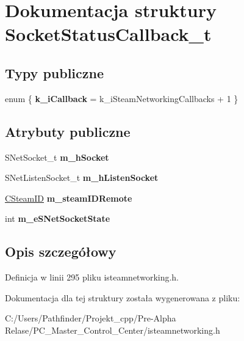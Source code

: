 \hypertarget{struct_socket_status_callback__t}{}\section{Dokumentacja struktury Socket\+Status\+Callback\+\_\+t}
\label{struct_socket_status_callback__t}
\subsection*{Typy publiczne}
\begin{DoxyCompactItemize}
\item 
\mbox{\label{struct_socket_status_callback__t_a965fa48a222eeb9caa24f61f2b29d069}} 
enum \{ {\bfseries k\+\_\+i\+Callback} = k\+\_\+i\+Steam\+Networking\+Callbacks + 1
 \}
\end{DoxyCompactItemize}
\subsection*{Atrybuty publiczne}
\begin{DoxyCompactItemize}
\item 
\mbox{\label{struct_socket_status_callback__t_ad7ee7cafc0fdcd80c4371a5d8cea4eaf}} 
S\+Net\+Socket\+\_\+t {\bfseries m\+\_\+h\+Socket}
\item 
\mbox{\label{struct_socket_status_callback__t_aad845fed84c16d48859c9f4951f50f13}} 
S\+Net\+Listen\+Socket\+\_\+t {\bfseries m\+\_\+h\+Listen\+Socket}
\item 
\mbox{\label{struct_socket_status_callback__t_ab661a13380c1b462aa930868c7bb1910}} 
\hyperlink{class_c_steam_i_d}{C\+Steam\+ID} {\bfseries m\+\_\+steam\+I\+D\+Remote}
\item 
\mbox{\label{struct_socket_status_callback__t_aa6d1d67a89034b140b79986172109837}} 
int {\bfseries m\+\_\+e\+S\+Net\+Socket\+State}
\end{DoxyCompactItemize}


\subsection{Opis szczegółowy}


Definicja w linii 295 pliku isteamnetworking.\+h.



Dokumentacja dla tej struktury została wygenerowana z pliku\+:\begin{DoxyCompactItemize}
\item 
C\+:/\+Users/\+Pathfinder/\+Projekt\+\_\+cpp/\+Pre-\/\+Alpha Relase/\+P\+C\+\_\+\+Master\+\_\+\+Control\+\_\+\+Center/isteamnetworking.\+h\end{DoxyCompactItemize}
